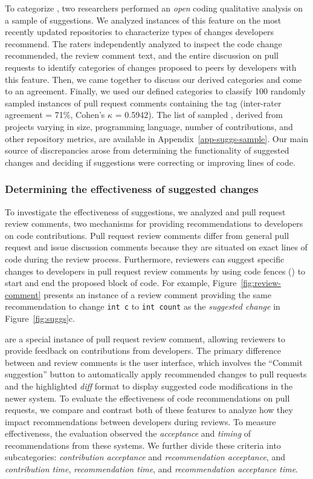 To categorize \suggs, two researchers performed an \textit{open} coding qualitative analysis on a sample of suggestions. We analyzed instances of this feature on the most recently updated repositories to characterize types of changes developers recommend. The raters independently analyzed \sugg to inspect the code change recommended, the review comment text, and the entire discussion on pull requests to identify categories of changes proposed to peers by developers with this feature. Then, we came together to discuss our derived categories and come to an agreement. Finally, we used our defined categories to classify 100 randomly sampled instances of pull request comments containing the \suggtag tag (inter-rater agreement = 71\%, Cohen's $\kappa$ = 0.5942). The list of sampled \sugg, derived from projects varying in size, programming language, number of contributions, and other repository metrics, are available in Appendix~\ref{app-suggs-sample}. Our main source of discrepancies arose from determining the functionality of suggested changes and deciding if suggestions were correcting or improving lines of code.

\subsubsection{Determining the effectiveness of suggested changes}

To investigate the effectiveness of suggestions, we analyzed \suggs and pull request review comments, two mechanisms for providing recommendations to developers on code contributions. Pull request review comments differ from general pull request and issue discussion comments because they are situated on exact lines of code during the review process. Furthermore, reviewers can suggest specific changes to developers in pull request review comments by using code fences (\fence) to start and end the proposed block of code. For example, Figure~\ref{fig:review-comment} presents an instance of a review comment providing the same recommendation to change \texttt{int c} to \texttt{int count} as the \textsl{suggested change} in Figure~\ref{fig:suggs}c. 

\suggs are a special instance of pull request review comment, allowing reviewers to provide feedback on contributions from developers. The primary difference between \sugg and review comments is the user interface, which involves the ``Commit suggestion'' button to automatically apply recommended changes to pull requests and the highlighted \textit{diff} format to display suggested code modifications in the newer system. To evaluate the effectiveness of code recommendations on pull requests, we compare and contrast both of these features to analyze how they impact recommendations between developers during reviews. To measure effectiveness, the evaluation observed the \textit{acceptance} and \textit{timing} of recommendations from these systems. We further divide these criteria into subcategories: \textit{contribution acceptance} and \textit{recommendation acceptance}, and \textit{contribution time}, \textit{recommendation time}, and \textit{recommendation acceptance time}.

